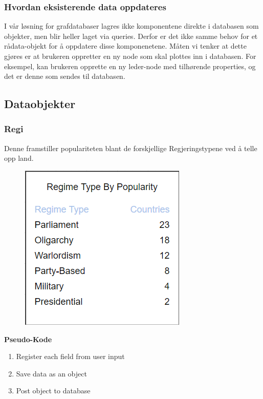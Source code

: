 \subsubsection{Hvordan eksisterende data oppdateres}
I vår løsning for grafdatabaser lagres ikke komponentene direkte i databasen som objekter, men blir 
heller laget via queries. Derfor er det ikke samme behov for et rådata-objekt for å oppdatere disse 
komponenetene. Måten vi tenker at dette gjøres er at brukeren oppretter en ny node som skal 
plottes inn i databasen. For eksempel, kan brukeren opprette en ny leder-node med tilhørende 
properties, og det er denne som sendes til databasen.

\subsection{Dataobjekter}
\subsubsection{Regi}
Denne framstiller populariteten blant de forskjellige Regjeringstypene ved å telle opp land.

\FigureCounter
\begin{figure}[H]
  \includegraphics[scale=1]{images/milepael4/regimeTypeByPopularity.png}
\end{figure}

\textbf{Pseudo-Kode}
\begin{enumerate}
  \item Register each field from user input
  \item Save data as an object
  \item Post object to database
\end{enumerate}